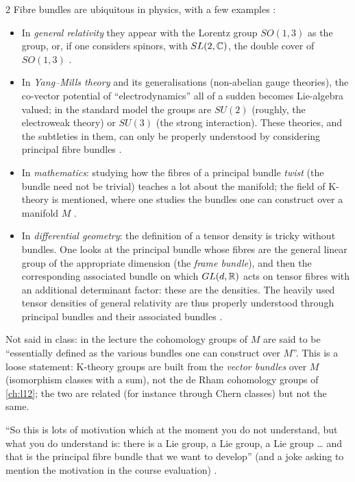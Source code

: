 \begin{paracol}{2}
Fibre bundles are ubiquitous in physics, with a few examples :
\begin{itemize}
  \item In \emph{general relativity} they appear with the Lorentz group $SO(1,3)$ as the group, or, if one considers spinors, with $SL(2,\mathbb{C})$, the double cover of $SO(1,3)$ .
  \item In \emph{Yang--Mills theory} and its generalisations (non-abelian gauge theories), the co-vector potential of ``electrodynamics'' all of a sudden becomes Lie-algebra valued; in the standard model the groups are $SU(2)$ (roughly, the electroweak theory) or $SU(3)$ (the strong interaction). These theories, and the subtleties in them, can only be properly understood by considering principal fibre bundles   .
  \item In \emph{mathematics}: studying how the fibres of a principal bundle \emph{twist} (the bundle need not be trivial) teaches a lot about the manifold; the field of K-theory is mentioned, where one studies the bundles one can construct over a manifold $M$    .
  \item In \emph{differential geometry}: the definition of a tensor density is tricky without bundles. One looks at the principal bundle whose fibres are the general linear group of the appropriate dimension (the \emph{frame bundle}), and then the corresponding associated bundle on which $GL(d,\mathbb{R})$ acts on tensor fibres with an additional determinant factor: these are the densities. The heavily used tensor densities of general relativity are thus properly understood through principal bundles and their associated bundles   .
\end{itemize}
\begin{coursenote}
Not said in class: in the lecture the cohomology groups of $M$ are said to be ``essentially defined as the various bundles one can construct over $M$''. This is a loose statement: K-theory groups are built from the \emph{vector bundles} over $M$ (isomorphism classes with a sum), not the de Rham cohomology groups of \cref{ch:l12}; the two are related (for instance through Chern classes) but not the same. 
\end{coursenote}
``So this is lots of motivation which at the moment you do not understand, but what you do understand is: there is a Lie group, a Lie group, a Lie group \ldots{} and that is the principal fibre bundle that we want to develop'' (and a joke asking to mention the motivation in the course evaluation) .


\end{paracol}
